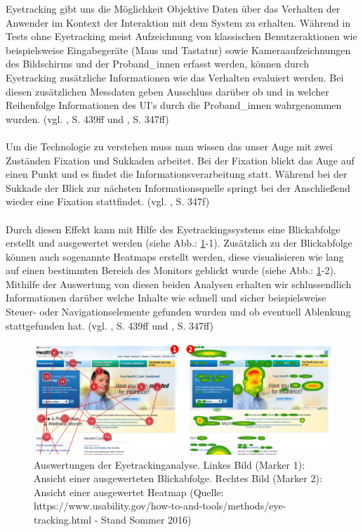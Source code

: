 \documentclass[Bachelorarbeit.tex]{subfiles}
\begin{document}
Eyetracking gibt uns die Möglichkeit Objektive Daten über das Verhalten der Anwender im Kontext der Interaktion mit dem System zu erhalten.
Während in Tests ohne Eyetracking meist Aufzeichnung von klassischen Benutzeraktionen wie beispielsweise Eingabegeräte (Maus und Tastatur) sowie Kameraaufzeichnungen des Bildschirms und der Proband\_innen erfasst werden, können durch Eyetracking zusätzliche Informationen wie das Verhalten evaluiert werden.
Bei diesen zusätzlichen Messdaten geben Ausschluss darüber ob und in welcher Reihenfolge Informationen des \ac{UI}'s durch die Proband\_innen wahrgenommen wurden. (vgl. \cite{Niegemann2008}, S. 439ff und \cite{Burmester}, S. 347ff)\\
\\
Um die Technologie zu verstehen muss man wissen das unser Auge mit zwei Zuständen Fixation und Sukkaden arbeitet.
Bei der Fixation blickt das Auge auf einen Punkt und es findet die Informationsverarbeitung statt. 
Während bei der Sukkade der Blick zur nächsten Informationsquelle springt bei der Anschließend wieder eine Fixation stattfindet. (vgl. \cite{Burmester}, S. 347f)\\
\\
Durch diesen Effekt kann mit Hilfe des Eyetrackingssystems eine Blickabfolge erstellt und ausgewertet werden (siehe Abb.: \ref{fig:Eyetracking}-1).
Zusätzlich zu der Blickabfolge können auch sogenannte Heatmaps erstellt werden, diese visualisieren wie lang auf einen bestimmten Bereich des Monitors geblickt wurde (siehe Abb.: \ref{fig:Eyetracking}-2).
Mithilfe der Auswertung von diesen beiden Analysen erhalten wir schlussendlich Informationen darüber welche Inhalte wie schnell und sicher beispielsweise Steuer- oder Navigationselemente gefunden wurden und ob eventuell Ablenkung stattgefunden hat. (vgl. \cite{Niegemann2008}, S. 439ff und \cite{Burmester}, S. 347ff)


\begin{figure}[H]
\centering
\includegraphics[width=1\linewidth]{img/Evaluation/Eyetracking}
\caption[Auswertungen der Eyetrackinganalyse]{Auswertungen der Eyetrackinganalyse. Linkes Bild (Marker 1): Ansicht einer ausgewerteten Blickabfolge. Rechtes Bild (Marker 2): Ansicht einer ausgewertet Heatmap (Quelle: https://www.usability.gov/how-to-and-tools/methods/eye-tracking.html - Stand Sommer 2016)}
\label{fig:Eyetracking}
\end{figure}
\end{document}
